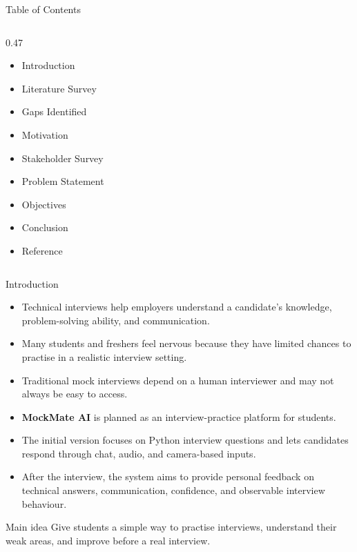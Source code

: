\documentclass[aspectratio=169,11pt]{beamer}
\begin{document}
\begin{frame}{Table of Contents}

\begin{columns}[T,onlytextwidth]

    \begin{column}{0.47\textwidth}
        \begin{itemize}
            \item Introduction
            \item Literature Survey
            \item Gaps Identified
            \item Motivation
            \item Stakeholder Survey
            \item Problem Statement
            \item Objectives
            \item Conclusion
            \item Reference
        \end{itemize}
    \end{column}

\end{columns}

\end{frame}

\begin{frame}{Introduction}
\begin{itemize}
  \item Technical interviews help employers understand a candidate's knowledge, problem-solving ability, and communication.
  \item Many students and freshers feel nervous because they have limited chances to practise in a realistic interview setting.
  \item Traditional mock interviews depend on a human interviewer and may not always be easy to access.
  \item \textbf{MockMate AI} is planned as an interview-practice platform for students.
  \item The initial version focuses on Python interview questions and lets candidates respond through chat, audio, and camera-based inputs.
  \item After the interview, the system aims to provide personal feedback on technical answers, communication, confidence, and observable interview behaviour.
\end{itemize}
\vspace{0.15cm}
\begin{block}{Main idea}
Give students a simple way to practise interviews, understand their weak areas, and improve before a real interview.
\end{block}
\end{frame}
\end{document}
